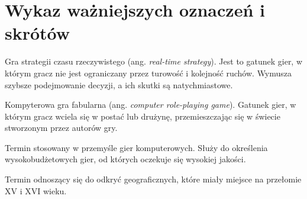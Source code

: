 \chapter*{Wykaz ważniejszych oznaczeń i skrótów}
\begin{description}[style=multiline,leftmargin=3cm]
\item[RTS] Gra strategii czasu rzeczywistego (ang. \textit{real-time strategy}). Jest to gatunek gier, w którym gracz nie jest
ograniczany przez turowość i kolejność ruchów. Wymusza szybsze podejmowanie decyzji, a ich skutki są natychmiastowe.
\item[cRPG] Kompyterowa gra fabularna (ang. \textit{computer role-playing game}). Gatunek gier, w którym gracz wciela
się w postać lub drużynę, przemieszczając się w świecie stworzonym przez autorów gry.
\item[AAA (Triple-A)] Termin stosowany w przemyśle gier komputerowych. Służy do określenia wysokobudżetowych gier, od
których oczekuje się wysokiej jakości.
\item[Wielkie odkrycia geograficzne] Termin odnoszący się do odkryć geograficznych, które miały miejsce na przełomie XV
i XVI wieku.
\end{description}
